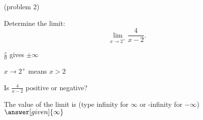 \documentclass{ximera}
\begin{document}
\begin{problem}(problem 2)
  
	Determine the limit:
  \[
  \lim_{x \to 2^+} \frac{4}{x-2}.
  \]
		
		\begin{hint}
      $\frac{c}{0}$ gives $\pm \infty$
    \end{hint}
    \begin{hint}
      $x \to 2^+$ means $x>2$
    \end{hint}
    \begin{hint}
      Is $\frac{4}{x-2}$ positive or negative?
    \end{hint}
    
		The value of the limit is
		(type infinity for $\infty$ or -infinity for $-\infty$)
		 $\answer[given]{\infty}$
		
\end{problem}
\end{document}

